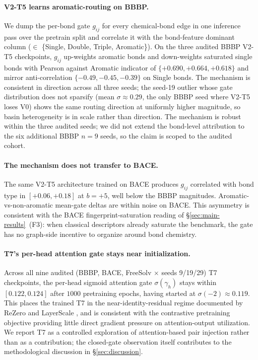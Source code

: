 \paragraph{V2-T5 learns aromatic-routing on BBBP.}
\label{sec:aromatic-routing}
We dump the per-bond gate $g_{ij}$ for every chemical-bond edge in one
inference pass over the pretrain split and correlate it with the
bond-feature dominant column ($\in$ \{Single, Double, Triple, Aromatic\}).
On the three audited BBBP V2-T5 checkpoints, $g_{ij}$ up-weights aromatic
bonds and down-weights saturated single bonds with Pearson against
Aromatic indicator of $\{+0.690, +0.664, +0.618\}$ and mirror
anti-correlation $\{-0.49, -0.45, -0.39\}$ on Single bonds. The mechanism
is consistent in direction across all three seeds; the seed-19 outlier
whose gate distribution does not sparsify
(mean $\sigma {\approx} 0.29$, the only BBBP seed where V2-T5 loses V0)
shows the same routing direction at uniformly higher magnitude, so basin
heterogeneity is in scale rather than direction. The mechanism is
robust within the three audited seeds; we did not extend the bond-level
attribution to the six additional BBBP $n{=}9$ seeds, so the claim is
scoped to the audited cohort.

\paragraph{The mechanism does not transfer to BACE.} The same V2-T5
architecture trained on BACE produces $g_{ij}$ correlated with bond type
in $[+0.06, +0.18]$ at $b{=}{+}5$, well below the BBBP magnitudes.
Aromatic-vs-non-aromatic mean-gate deltas are within noise on BACE. This
asymmetry is consistent with the BACE fingerprint-saturation reading of
\S\ref{sec:main-results}~(F3): when classical descriptors already
saturate the benchmark, the gate has no graph-side incentive to organize
around bond chemistry.

\paragraph{T7's per-head attention gate stays near initialization.}
\label{sec:t7-closed-gate}
Across all nine audited (BBBP, BACE, FreeSolv $\times$ seeds 9/19/29)
T7 checkpoints, the per-head sigmoid attention gate
$\sigma(\gamma_h)$ stays within $[0.122, 0.124]$ after $1000$ pretraining
epochs, having started at $\sigma(-2) \approx 0.119$. This places the
trained T7 in the near-identity-residual regime documented by ReZero
\cite{bachlechner2021rezero} and LayerScale \cite{touvron2021cait}, and
is consistent with the contrastive pretraining objective providing little
direct gradient pressure on attention-output utilization. We report T7
as a controlled exploration of attention-based pair injection rather
than as a contribution; the closed-gate observation itself contributes to
the methodological discussion in \S\ref{sec:discussion}.

